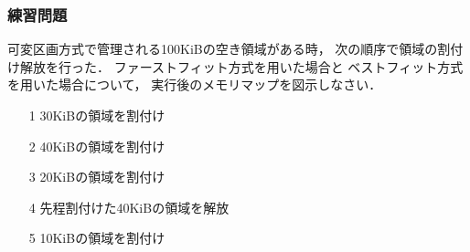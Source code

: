\documentclass{beamer}                   %
\begin{document}
\begin{frame}
  \frametitle{練習問題}
  可変区画方式で管理される100KiBの空き領域がある時，
  次の順序で領域の割付け解放を行った．
  ファーストフィット方式を用いた場合と
  ベストフィット方式を用いた場合について，
  実行後のメモリマップを図示しなさい．

  \begin{enumerate}
  \item[1] 30KiBの領域を割付け
  \item[2] 40KiBの領域を割付け
  \item[3] 20KiBの領域を割付け
  \item[4] 先程割付けた40KiBの領域を解放
  \item[5] 10KiBの領域を割付け
  \end{enumerate}
\end{frame}
\end{document}
